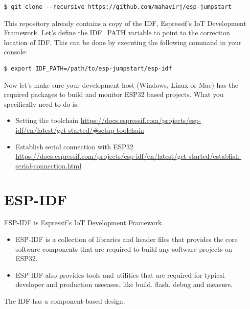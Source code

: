 \documentclass[main.tex]{subfiles}
\begin{document}
\begin{verbatim}
$ git clone --recursive https://github.com/mahavirj/esp-jumpstart
\end{verbatim}

This repository already contains a copy of the IDF, Espressif's IoT Development Framework. Let's define the IDF\_PATH variable to point to the correction location of IDF. This can be done by executing the following command in your console:

\begin{verbatim}
$ export IDF_PATH=/path/to/esp-jumpstart/esp-idf
\end{verbatim}

Now let's make sure your development host (Windows, Linux or Mac) has the required packages to build and monitor ESP32 based projects. What you specifically need to do is:
\begin{itemize}
    \item Setting the toolchain \url{https://docs.espressif.com/projects/esp-idf/en/latest/get-started/#setup-toolchain}
    \item Establish serial connection with ESP32 \url{https://docs.espressif.com/projects/esp-idf/en/latest/get-started/establish-serial-connection.html}
\end{itemize}

\section{ESP-IDF}

ESP-IDF is Espressif's IoT Development Framework. 
\begin{itemize}
    \item ESP-IDF is a collection of libraries and header files that provides the core software components that are required to build any software projects on ESP32. 
    \item ESP-IDF also provides tools and utilities that are required for typical developer and production usecases, like build, flash, debug and measure.
\end{itemize}

The IDF has a component-based design. 
\end{document}
